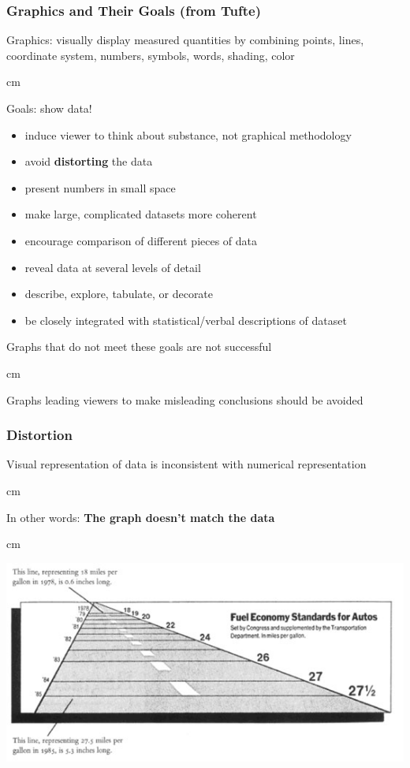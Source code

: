 \documentclass{beamer} %
\begin{document}
\begin{frame}\frametitle{Graphics and Their Goals (from Tufte)}
	\small
	
	Graphics:  visually display measured quantities by combining points, lines, coordinate system, numbers, symbols, words, shading, color
	
	 cm
	
	Goals:  show data!
	
	\begin{itemize}
		\item induce viewer to think about substance, not graphical methodology
		\item avoid \textbf{distorting} the data
		\item present numbers in small space
		\item make large, complicated datasets more coherent
		\item encourage comparison of different pieces of data
		\item reveal data at several levels of detail
		\item describe, explore, tabulate, or decorate
		\item be closely integrated with statistical/verbal descriptions of dataset
	\end{itemize}
	
	Graphs that do not meet these goals are not successful
	
	 cm
	
	Graphs leading viewers to make misleading conclusions should be avoided
	
\end{frame}



\begin{frame}\frametitle{Distortion}
	\small
	
	Visual representation of data is inconsistent with numerical representation
	
	 cm
	
	In other words:  \textbf{The graph doesn't match the data}
	
	 cm
	
	\includegraphics[width=\linewidth]{fuel.jpg}
	
\end{frame}
\end{document}
